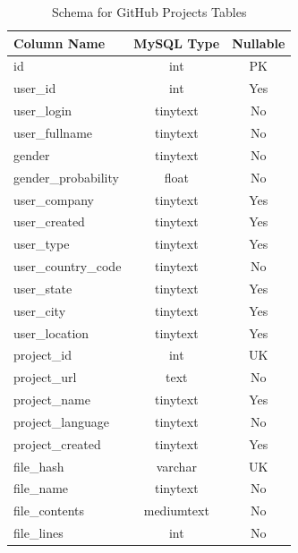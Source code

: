 \documentclass[12pt]{article}
\begin{document}
\begin{table}[h!]
    \begin{center}
        \caption{Schema for GitHub Projects Tables}
        \label{tab:git_projects_schema}
        \begin{tabular}{|l | c | c |}
            \hline
            \textbf{Column Name} & \textbf{MySQL Type} & \textbf{Nullable}\\
            \hline
            id & int & PK\\
            user{\_}id & int & Yes\\
            user{\_}login & tinytext & No\\
            user{\_}fullname & tinytext & No\\
            gender & tinytext & No\\
            gender{\_}probability & float & No\\
            user{\_}company  & tinytext & Yes\\
            user{\_}created & tinytext & Yes\\
            user{\_}type & tinytext & Yes\\
            user{\_}country{\_}code & tinytext & No\\
            user{\_}state & tinytext & Yes\\
            user{\_}city & tinytext & Yes\\
            user{\_}location & tinytext & Yes\\
            \hline
            project{\_}id & int & UK\\
            project{\_}url & text & No\\
            project{\_}name & tinytext & Yes\\
            project{\_}language & tinytext & No\\
            project{\_}created & tinytext & Yes\\
            \hline
            file{\_}hash & varchar & UK\\
            file{\_}name & tinytext & No\\
            file{\_}contents & mediumtext & No\\
            file{\_}lines & int & No\\
            \hline
        \end{tabular}
    \end{center}
\end{table}
\end{document}
